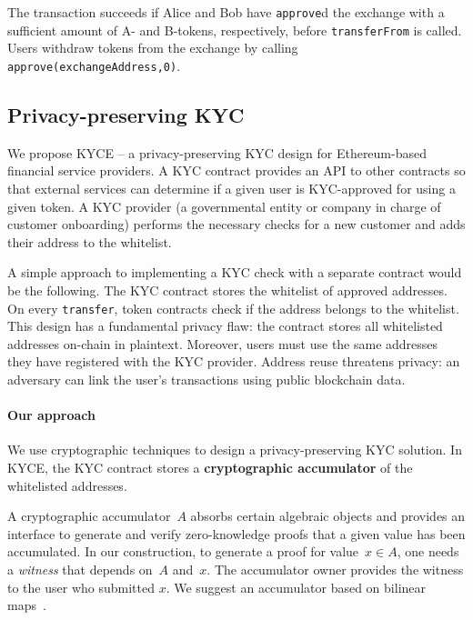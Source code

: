 The transaction succeeds if Alice and Bob have \texttt{approve}d the exchange with a sufficient amount of A- and B-tokens, respectively, before \texttt{transferFrom} is called.
Users withdraw tokens from the exchange by calling \texttt{approve(exchangeAddress,0)}.



\subsection{Privacy-preserving KYC}
\label{sec:PrivacyPreservingKYC}

We propose KYCE -- a privacy-preserving KYC design for Ethereum-based financial service providers.
A KYC contract provides an API to other contracts so that external services can determine if a given user is KYC-approved for using a given token.
A KYC provider (a governmental entity or company in charge of customer onboarding) performs the necessary checks for a new customer and adds their address to the whitelist.

A simple approach to implementing a KYC check with a separate contract would be the following.
The KYC contract stores the whitelist of approved addresses.
On every \texttt{transfer}, token contracts check if the address belongs to the whitelist.
This design has a fundamental privacy flaw: the contract stores all whitelisted addresses on-chain in plaintext.
Moreover, users must use the same addresses they have registered with the KYC provider.
Address reuse threatens privacy: an adversary can link the user's transactions using public blockchain data.

\paragraph{Our approach}
We use cryptographic techniques to design a privacy-preserving KYC solution.
In KYCE, the KYC contract stores a \textbf{cryptographic accumulator} of the whitelisted addresses. 

A cryptographic accumulator~$A$ absorbs certain algebraic objects and provides an interface to generate and verify zero-knowledge proofs that a given value has been accumulated.
In our construction, to generate a proof for value~$x\in A$, one needs a \textit{witness} that depends on~$A$ and~$x$.
The accumulator owner provides the witness to the user who submitted $x$.
We suggest an accumulator based on bilinear maps~\cite{Camenisch2009}.

